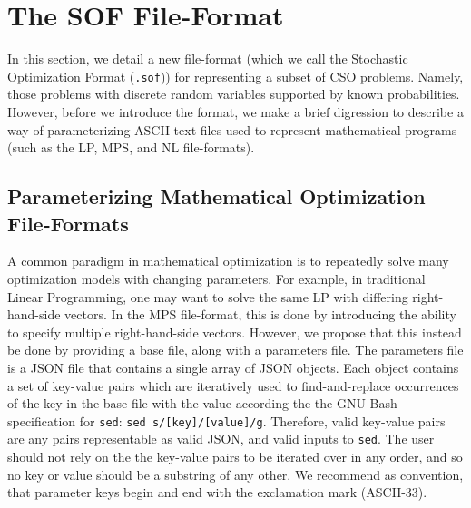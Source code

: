 \documentclass[final,1p,times]{elsarticle}
\begin{document}




\section{The SOF File-Format}\label{sec:fileformat}

In this section, we detail a new file-format (which we call the Stochastic Optimization Format (\texttt{.sof})) for representing a subset of CSO problems. Namely, those problems with discrete random variables supported by known probabilities. However, before we introduce the format, we make a brief digression to describe a way of parameterizing ASCII text files used to represent mathematical programs (such as the LP, MPS, and NL file-formats).

\subsection{Parameterizing Mathematical Optimization File-Formats}\label{sec:parameters}

A common paradigm in mathematical optimization is to repeatedly solve many optimization models with changing parameters. For example, in traditional Linear Programming, one may want to solve the same LP with differing right-hand-side vectors. In the MPS file-format, this is done by introducing the ability to specify multiple right-hand-side vectors. However, we propose that this instead be done by providing a base file, along with a parameters file. The parameters file is a JSON file that contains a single array of JSON objects. Each object contains a set of key-value pairs which are iteratively used to find-and-replace occurrences of the key in the base file with the value according the the GNU Bash specification for \texttt{sed}: \texttt{sed s/[key]/[value]/g}. Therefore, valid key-value pairs are any pairs representable as valid JSON, and valid inputs to \texttt{sed}. The user should not rely on the the key-value pairs to be iterated over in any order, and so no key or value should be a substring of any other. We recommend as convention, that parameter keys begin and end with the exclamation mark (ASCII-33).
\end{document}
